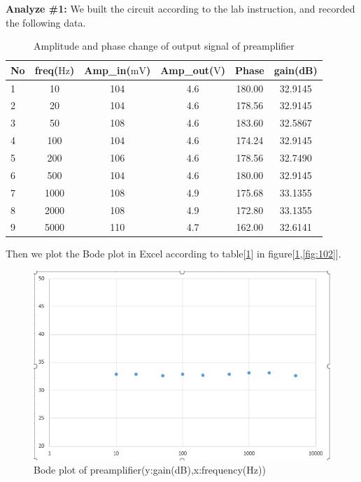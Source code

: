 \textbf{Analyze \#1:} \newline
\phantom{ } We built the circuit according to the lab instruction, and recorded the following data.\\
\begin{table}[!htbp]
	\centering
	\caption{Amplitude and phase change of output signal of preamplifier}
	\begin{tabular}{lccccc}
		\toprule
		No &freq($\si{\hertz}$) &Amp\_in($\si{\milli\volt}$)&Amp\_out($\si{\volt}$)&Phase&gain(dB)\\
		\midrule
		1	&10		&104	&4.6	&180.00	&32.9145\\
		2	&20		&104	&4.6	&178.56	&32.9145\\
		3	&50		&108	&4.6	&183.60	&32.5867\\
		4	&100	&104	&4.6	&174.24	&32.9145\\
		5	&200	&106	&4.6	&178.56	&32.7490\\
		6	&500	&104	&4.6	&180.00	&32.9145\\
		7	&1000	&108	&4.9	&175.68	&33.1355\\
		8	&2000	&108	&4.9	&172.80	&33.1355\\
		9	&5000	&110	&4.7	&162.00	&32.6141\\
		\bottomrule
	\end{tabular}
	\label{tab:preamp}
\end{table}
\phantom{ } Then we plot the Bode plot in Excel according to table[\ref{tab:preamp}] in figure[\ref{fig:101},\ref{fig:102}].

\begin{figure}[!htbp]
	\centering 
	\begin{framed}
		\includegraphics[width=\linewidth]{images/1_1.PNG} 
		\caption{Bode plot of preamplifier(y:gain(dB),x:frequency(Hz))}
		\label{fig:101} 
	\end{framed}
\end{figure} 

